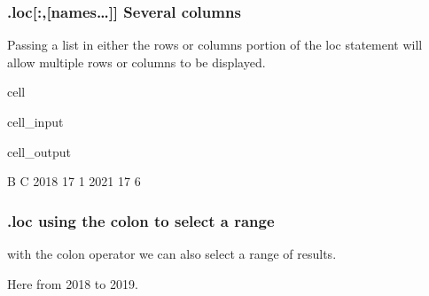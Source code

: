 \documentclass[letterpaper,10pt,english]{jupyterBook}
\begin{document}
\subsubsection{.loc{[}:,{[}names…{]}{]} Several columns}
\label{\detokenize{content/04_PythonEssentials/PythonPandasDataframes:loc-names-several-columns}}
\sphinxAtStartPar
Passing a list in either the rows or columns portion of the loc statement will allow multiple rows or columns to be displayed.

\begin{sphinxuseclass}{cell}\begin{sphinxVerbatimInput}

\begin{sphinxuseclass}{cell_input}
\begin{sphinxVerbatim}[commandchars=\\\{\}]
\PYG{p}{[}\PYG{p}{[}\PYG{p}{]}\PYG{p}{[}\PYG{p}{]}\PYG{p}{]}
\end{sphinxVerbatim}

\end{sphinxuseclass}\end{sphinxVerbatimInput}
\begin{sphinxVerbatimOutput}

\begin{sphinxuseclass}{cell_output}
\begin{sphinxVerbatim}[commandchars=\\\{\}]
       B  C
2018  17  1
2021  17  6
\end{sphinxVerbatim}

\end{sphinxuseclass}\end{sphinxVerbatimOutput}

\end{sphinxuseclass}

\subsubsection{.loc using the colon to select a range}
\label{\detokenize{content/04_PythonEssentials/PythonPandasDataframes:loc-using-the-colon-to-select-a-range}}
\sphinxAtStartPar
with the colon operator we can also select a range of results.

\sphinxAtStartPar
Here from 2018 to 2019.
\end{document}

